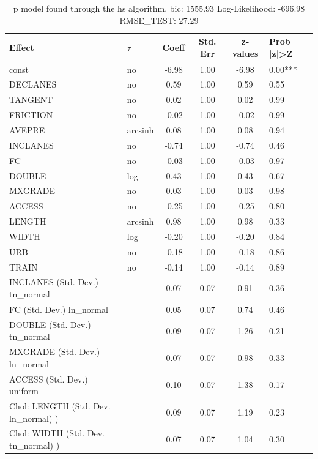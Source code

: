 \begin{table}
	\caption{p model found through the hs algorithm. bic: 1555.93 Log-Likelihood: -696.98 RMSE_TEST: 27.29}
	\begin{center}
		\begin{tabular}{|l|l|c|c|c|l|}
			\hline
			Effect & $\tau$ & Coeff & Std. Err & z-values & Prob |z|>Z \\
			\hline
			const & no & -6.98 & 1.00 & -6.98 & 0.00*** \\
			\hline
			DECLANES & no & 0.59 & 1.00 & 0.59 & 0.55 \\
			\hline
			TANGENT & no & 0.02 & 1.00 & 0.02 & 0.99 \\
			\hline
			FRICTION & no & -0.02 & 1.00 & -0.02 & 0.99 \\
			\hline
			AVEPRE & arcsinh & 0.08 & 1.00 & 0.08 & 0.94 \\
			\hline
			INCLANES & no & -0.74 & 1.00 & -0.74 & 0.46 \\
			\hline
			FC & no & -0.03 & 1.00 & -0.03 & 0.97 \\
			\hline
			DOUBLE & log & 0.43 & 1.00 & 0.43 & 0.67 \\
			\hline
			MXGRADE & no & 0.03 & 1.00 & 0.03 & 0.98 \\
			\hline
			ACCESS & no & -0.25 & 1.00 & -0.25 & 0.80 \\
			\hline
			LENGTH & arcsinh & 0.98 & 1.00 & 0.98 & 0.33 \\
			\hline
			WIDTH & log & -0.20 & 1.00 & -0.20 & 0.84 \\
			\hline
			URB & no & -0.18 & 1.00 & -0.18 & 0.86 \\
			\hline
			TRAIN & no & -0.14 & 1.00 & -0.14 & 0.89 \\
			\hline
			INCLANES (Std. Dev.) tn_normal &  & 0.07 & 0.07 & 0.91 & 0.36 \\
			\hline
			FC (Std. Dev.) ln_normal &  & 0.05 & 0.07 & 0.74 & 0.46 \\
			\hline
			DOUBLE (Std. Dev.) tn_normal &  & 0.09 & 0.07 & 1.26 & 0.21 \\
			\hline
			MXGRADE (Std. Dev.) ln_normal &  & 0.07 & 0.07 & 0.98 & 0.33 \\
			\hline
			ACCESS (Std. Dev.) uniform &  & 0.10 & 0.07 & 1.38 & 0.17 \\
			\hline
			 Chol: LENGTH (Std. Dev. ln_normal) ) &  & 0.09 & 0.07 & 1.19 & 0.23 \\
			\hline
			 Chol: WIDTH (Std. Dev. tn_normal) ) &  & 0.07 & 0.07 & 1.04 & 0.30 \\

\end{tabular}
\end{center}
\end{table}
